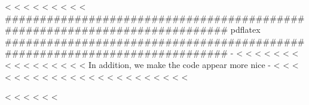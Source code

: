 <%
<%
<%
<%
<%
<%
<%
\else
<%
<%
###########################################################################
pdflatex
###########################################################################
-%
<%
<%
<%
<%
<%
<%
<%
<%
<%
<%
<%
<%
<%
<%
<%
<%
In addition, we make the code appear more nice -%
<%
<%
<%
<%
<%
<%
<%
<%
<%
<%
<%
<%
<%
<%
<%
<%
<%
<%
<%
<%
<%
<%
<%

<%
<%
<%
\fi
<%
<%
<%

